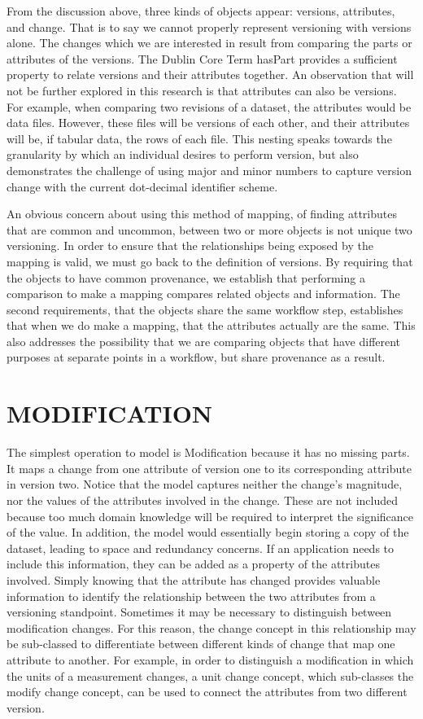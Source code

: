 From the discussion above, three kinds of objects appear: versions, attributes, and change.
That is to say we cannot properly represent versioning with versions alone.
The changes which we are interested in result from comparing the parts or attributes of the versions.
The Dublin Core Term hasPart provides a sufficient property to relate versions and their attributes together.
An observation that will not be further explored in this research is that attributes can also be versions.
For example, when comparing two revisions of a dataset, the attributes would be data files.
However, these files will be versions of each other, and their attributes will be, if tabular data, the rows of each file.
This nesting speaks towards the granularity by which an individual desires to perform version, but also demonstrates the challenge of using major and minor numbers to capture version change with the current dot-decimal identifier scheme.

An obvious concern about using this method of mapping, of finding attributes that are common and uncommon, between two or more objects is not unique two versioning.
In order to ensure that the relationships being exposed by the mapping is valid, we must go back to the definition of versions.
By requiring that the objects to have common provenance, we establish that performing a comparison to make a mapping compares related objects and information.
The second requirements, that the objects share the same workflow step, establishes that when we do make a mapping, that the attributes actually are the same.
This also addresses the possibility that we are comparing objects that have different purposes at separate points in a workflow, but share provenance as a result.

\section{MODIFICATION}

The simplest operation to model is Modification because it has no missing parts.
It maps a change from one attribute of version one to its corresponding attribute in version two.
Notice that the model captures neither the change's magnitude, nor the values of the attributes involved in the change.
These are not included because too much domain knowledge will be required to interpret the significance of the value.
In addition, the model would essentially begin storing a copy of the dataset, leading to space and redundancy concerns.
If an application needs to include this information, they can be added as a property of the attributes involved.
Simply knowing that the attribute has changed provides valuable information to identify the relationship between the two attributes from a versioning standpoint.
Sometimes it may be necessary to distinguish between modification changes.
For this reason, the change concept in this relationship may be sub-classed to differentiate between different kinds of change that map one attribute to another.
For example, in order to distinguish a modification in which the units of a measurement changes, a unit change concept, which sub-classes the modify change concept, can be used to connect the attributes from two different version.

